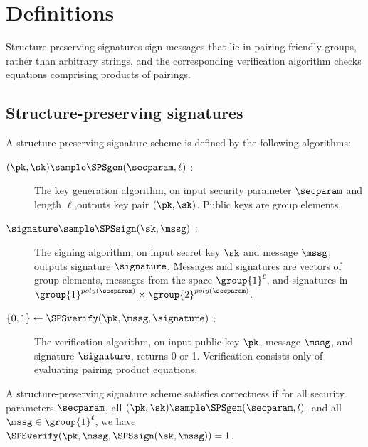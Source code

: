 \section{Definitions}\label{sec:tsps-definitions}

Structure-preserving signatures sign messages that lie in
pairing-friendly groups, rather than arbitrary strings, and the corresponding
verification algorithm checks equations comprising products of pairings.

\subsection{Structure-preserving signatures}

A structure-preserving signature scheme is defined by the following algorithms:

\begin{description}

  \item[$(\pk, \sk) \sample \SPSgen(\secparam, \ell)$ :] The key generation
    algorithm, on input security parameter $\secparam$ and length
    $\ell$,outputs key pair $(\pk, \sk)$. Public keys are group elements.

  \item[$\signature \sample \SPSsign(\sk, \mssg)$ :] The signing algorithm, on
    input secret key $\sk$ and message $\mssg$, outputs signature $\signature$.
    Messages and signatures are vectors of group elements, messages from the
    space $\group{1}^\ell$, and signatures in $\group{1}^{poly(\secparam)}
    \times \group{2}^{poly(\secparam)}$.

  \item[$\{0,1\} \leftarrow \SPSverify(\pk, \mssg, \signature)$ :] The
    verification algorithm, on input public key $\pk$, message $\mssg$, and
    signature $\signature$, returns 0 or 1. Verification consists only of
    evaluating pairing product equations.

\end{description}

A structure-preserving signature scheme satisfies correctness if for all
security parameters $\secparam$, all $(\pk, \sk) \sample \SPSgen(\secparam,
l)$, and all $\mssg \in \group{1}^\ell$, we have $\SPSverify(\pk, \mssg,
\SPSsign(\sk, \mssg)) = 1$.

